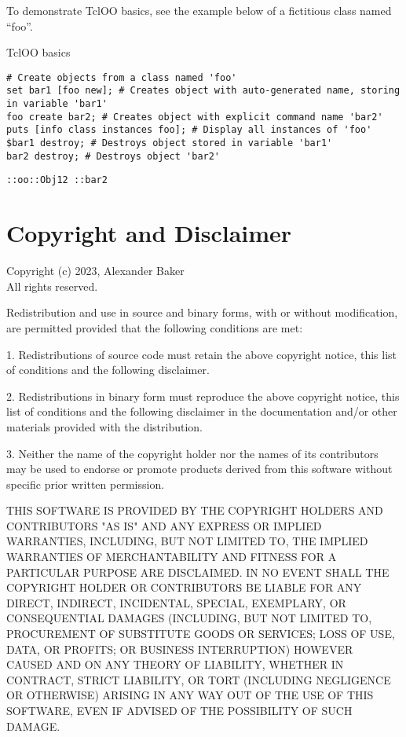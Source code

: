 To demonstrate TclOO basics, see the example below of a fictitious class named ``foo''.
\begin{example}{TclOO basics}
\begin{lstlisting}
# Create objects from a class named 'foo'
set bar1 [foo new]; # Creates object with auto-generated name, storing in variable 'bar1'
foo create bar2; # Creates object with explicit command name 'bar2'
puts [info class instances foo]; # Display all instances of 'foo'
$bar1 destroy; # Destroys object stored in variable 'bar1'
bar2 destroy; # Destroys object 'bar2'
\end{lstlisting}
\tcblower
\begin{lstlisting}
::oo::Obj12 ::bar2
\end{lstlisting}
\end{example}

\cleartooddpage[\thispagestyle{empty}]
\section*{Copyright and Disclaimer}

Copyright (c) 2023, Alexander Baker \\
All rights reserved.

Redistribution and use in source and binary forms, with or without
modification, are permitted provided that the following conditions are met:

1. Redistributions of source code must retain the above copyright notice, this
   list of conditions and the following disclaimer.

2. Redistributions in binary form must reproduce the above copyright notice,
   this list of conditions and the following disclaimer in the documentation
   and/or other materials provided with the distribution.

3. Neither the name of the copyright holder nor the names of its
   contributors may be used to endorse or promote products derived from
   this software without specific prior written permission.

THIS SOFTWARE IS PROVIDED BY THE COPYRIGHT HOLDERS AND CONTRIBUTORS "AS IS"
AND ANY EXPRESS OR IMPLIED WARRANTIES, INCLUDING, BUT NOT LIMITED TO, THE
IMPLIED WARRANTIES OF MERCHANTABILITY AND FITNESS FOR A PARTICULAR PURPOSE ARE
DISCLAIMED. IN NO EVENT SHALL THE COPYRIGHT HOLDER OR CONTRIBUTORS BE LIABLE
FOR ANY DIRECT, INDIRECT, INCIDENTAL, SPECIAL, EXEMPLARY, OR CONSEQUENTIAL
DAMAGES (INCLUDING, BUT NOT LIMITED TO, PROCUREMENT OF SUBSTITUTE GOODS OR
SERVICES; LOSS OF USE, DATA, OR PROFITS; OR BUSINESS INTERRUPTION) HOWEVER
CAUSED AND ON ANY THEORY OF LIABILITY, WHETHER IN CONTRACT, STRICT LIABILITY,
OR TORT (INCLUDING NEGLIGENCE OR OTHERWISE) ARISING IN ANY WAY OUT OF THE USE
OF THIS SOFTWARE, EVEN IF ADVISED OF THE POSSIBILITY OF SUCH DAMAGE.
